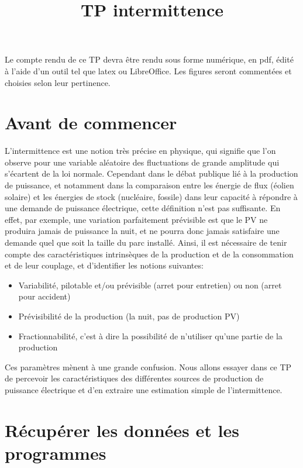 \documentclass{article}
\begin{document}
\title{TP intermittence}

\maketitle

Le compte rendu de ce TP devra être rendu sous forme numérique, en pdf,
édité à l'aide d'un outil tel que latex ou LibreOffice. Les figures seront
commentées et choisies selon leur pertinence.

\section{Avant de commencer}

L'intermittence est une notion très précise en physique, qui signifie que
l'on observe pour une variable aléatoire des fluctuations de grande amplitude
qui s'écartent de la loi normale. Cependant dans le débat publique lié à
la production de puissance, et notamment dans la comparaison entre les
énergie de flux (éolien solaire) et les énergies de stock (nucléaire,
fossile) dans leur capacité à répondre à une demande de puissance
électrique, cette définition n'est pas suffisante. En effet, par exemple,
une variation parfaitement prévisible est que le PV ne produira jamais de
puissance la nuit, et ne pourra donc jamais satisfaire une demande quel que
soit la taille du parc installé. Ainsi, il est nécessaire de tenir compte
des caractéristiques intrinsèques de la production et de la consommation et
de leur couplage, et d'identifier les notions suivantes:
\begin{itemize}
  \item Variabilité, pilotable et/ou prévisible (arret pour entretien) ou
  non (arret pour accident)
  
  \item Prévisibilité de la production (la nuit, pas de production PV)
  
  \item Fractionnabilité, c'est à dire la possibilité de n'utiliser qu'une
  partie de la production 
\end{itemize}
Ces paramètres mènent à une grande confusion. Nous allons essayer dans ce
TP de percevoir les caractéristiques des différentes sources de production
de puissance électrique et d'en extraire une estimation simple de
l'intermittence.

\section{Récupérer les données et les programmes}
\end{document}
